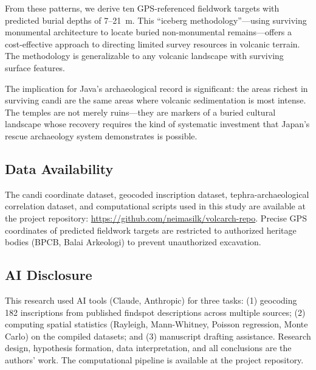 \documentclass[12pt,a4paper]{article}
\begin{document}
From these patterns, we derive ten GPS-referenced fieldwork targets with predicted burial depths of 7--21~m. This ``iceberg methodology''---using surviving monumental architecture to locate buried non-monumental remains---offers a cost-effective approach to directing limited survey resources in volcanic terrain. The methodology is generalizable to any volcanic landscape with surviving surface features.

The implication for Java's archaeological record is significant: the areas richest in surviving candi are the same areas where volcanic sedimentation is most intense. The temples are not merely ruins---they are markers of a buried cultural landscape whose recovery requires the kind of systematic investment that Japan's rescue archaeology system demonstrates is possible.


\subsection*{Data Availability}

The candi coordinate dataset, geocoded inscription dataset, tephra-archaeological correlation dataset, and computational scripts used in this study are available at the project repository: \url{https://github.com/neimasilk/volcarch-repo}. Precise GPS coordinates of predicted fieldwork targets are restricted to authorized heritage bodies (BPCB, Balai Arkeologi) to prevent unauthorized excavation.


\subsection*{AI Disclosure}

This research used AI tools (Claude, Anthropic) for three tasks: (1) geocoding 182 inscriptions from published findspot descriptions across multiple sources; (2) computing spatial statistics (Rayleigh, Mann-Whitney, Poisson regression, Monte Carlo) on the compiled datasets; and (3) manuscript drafting assistance. Research design, hypothesis formation, data interpretation, and all conclusions are the authors' work. The computational pipeline is available at the project repository.
\end{document}
